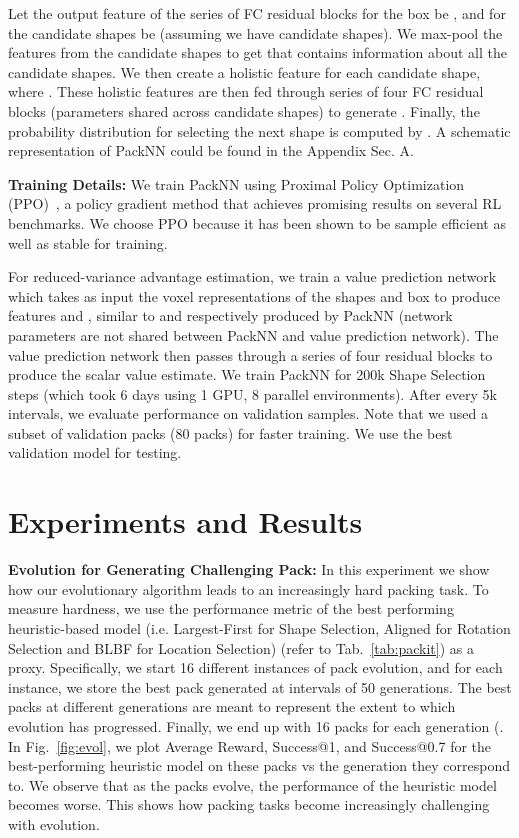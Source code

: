 \documentclass{article}
\begin{document}
Let the output feature of the series of FC residual blocks for the box be , and for the candidate shapes be  (assuming we have  candidate shapes). We max-pool the features from the candidate shapes to get   that contains information about all the candidate shapes. We then create a holistic feature  for each candidate shape, where . These holistic features are then fed through series of four FC residual blocks (parameters shared across candidate shapes) to generate . Finally, the probability distribution for selecting the next shape is computed by . A schematic representation of PackNN could be found in the Appendix Sec. A.

\noindent\textbf{Training Details:} We train PackNN using Proximal Policy Optimization (PPO)~\cite{schulman2017proximal}, a policy gradient method that achieves promising results on several RL benchmarks. We choose PPO because it has been shown to be sample efficient as well as stable for training.

For reduced-variance advantage estimation, we train a value prediction network which takes as input the voxel representations of the shapes and box to produce features  and , similar to  and  respectively produced by PackNN (network parameters are not shared between PackNN and value prediction network). The value prediction network then passes  through a series of four residual blocks to produce the scalar value estimate. We train PackNN for 200k Shape Selection steps (which took 6 days using 1 GPU, 8 parallel environments). After every 5k intervals, we evaluate performance on validation samples. Note that we used a subset of validation packs (80 packs) for faster training. We use the best validation model for testing. 

\section{Experiments and Results}
\label{sec:experiments}
\noindent\textbf{Evolution for Generating Challenging Pack:} In this experiment we show how our evolutionary algorithm leads to an increasingly hard packing task. To measure hardness, we use the performance metric of the best performing heuristic-based model (i.e. Largest-First for Shape Selection, Aligned for Rotation Selection and BLBF for Location Selection) (refer to Tab.~\ref{tab:packit}) as a proxy. Specifically, we start 16 different instances of pack evolution, and for each instance, we store the best pack generated at intervals of 50 generations. The best packs at different generations are meant to represent the extent to which evolution has progressed. Finally, we end up with 16 packs for each  generation (. In Fig.~\ref{fig:evol}, we plot Average Reward, Success@1, and Success@0.7 for the best-performing heuristic model on these packs vs the generation they correspond to. We observe that as the packs evolve, the performance of the heuristic model becomes worse. This shows how packing tasks become increasingly challenging with evolution.
\end{document}
